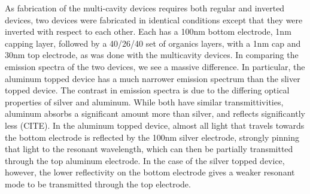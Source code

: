 \documentclass{report}
\begin{document}
            As fabrication of the multi-cavity devices requires both regular and inverted devices, two devices were fabricated in identical conditions except that they were inverted with respect to each other. Each has a 100nm bottom electrode, 1nm capping layer, followed by a 40/26/40 set of organics layers, with a 1nm cap and 30nm top electrode, as was done with the multicavity devices. In comparing the emission spectra of the two devices, we see a massive difference. In particular, the aluminum topped device has a much narrower emission spectrum than the sliver topped device. The contrast in emission spectra is due to the differing optical properties of silver and aluminum. While both have similar transmittivities, aluminum absorbs a significant amount more than silver, and reflects significantly less (CITE). In the aluminum topped device, almost all light that travels towards the bottom electrode is reflected by the 100nm silver electrode, strongly pinning that light to the resonant wavelength, which can then be partially transmitted through the top aluminum electrode. In the case of the silver topped device, however, the lower reflectivity on the bottom electrode gives a weaker resonant mode to be transmitted through the top electrode.
\end{document}
